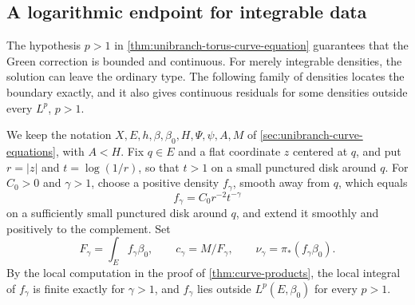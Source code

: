 \subsection{A logarithmic endpoint for integrable data}
\label{subsec:unibranch-curve-density-endpoint}

The hypothesis $p>1$ in \cref{thm:unibranch-torus-curve-equation} guarantees that the Green correction is bounded and continuous. For merely integrable densities, the solution can leave the ordinary type. The following family of densities locates the boundary exactly, and it also gives continuous residuals for some densities outside every $L^p$, $p>1$.

We keep the notation $X,E,h,\beta,\beta_0,H,\Psi,\psi,A,M$ of \cref{sec:unibranch-curve-equations}, with $A<H$. Fix $q\in E$ and a flat coordinate $z$ centered at $q$, and put $r=|z|$ and $t=\log(1/r)$, so that $t>1$ on a small punctured disk around $q$. For $C_0>0$ and $\gamma>1$, choose a positive density $f_\gamma$, smooth away from $q$, which equals
\[
 f_\gamma=C_0r^{-2}t^{-\gamma}
\]
on a sufficiently small punctured disk around $q$, and extend it smoothly and positively to the complement. Set
\[
 F_\gamma=\int_Ef_\gamma\beta_0,\qquad
 c_\gamma=M/F_\gamma,\qquad
 \nu_\gamma=\pi_*(f_\gamma\beta_0).
\]
By the local computation in the proof of \cref{thm:curve-products}, the local integral of $f_\gamma$ is finite exactly for $\gamma>1$, and $f_\gamma$ lies outside $L^p(E,\beta_0)$ for every $p>1$.

